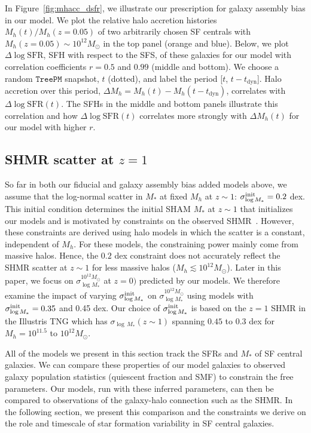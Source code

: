 \documentclass[12pt, letterpaper, preprint, tighten]{aastex62}
\newcommand{\edt}[1]{{\color{dred}{\bf} #1}}
\newcommand{\logsfr}{\log\mathrm{SFR}}
\newcommand{\siglogm}{\sigma_{\log M_*}}
\begin{document}
In Figure~\ref{fig:mhacc_dsfr}, we illustrate our prescription for galaxy
assembly bias in our model. We plot the relative halo accretion histories
$M_h(t)/M_h(z{=}0.05)$ of two arbitrarily chosen SF centrals with
$M_h(z{=}0.05)\sim10^{12}M_\odot$ in the top panel (orange and blue). Below, we plot
$\Delta\logsfr$, SFH with respect to the SFS, of these galaxies for our model with
correlation coefficients $r=0.5$ and $0.99$ (middle and bottom). We choose a
random $\mathtt{TreePM}$ snapshot, $t$ (dotted), and label the period
[$t$, $t - t_\mathrm{dyn}$]. Halo accretion over this period,
$\Delta M_h = M_h(t) - M_h(t-t_\mathrm{dyn})$, correlates with $\Delta\logsfr(t)$.
The SFHs in the middle and bottom panels illustrate this correlation and how
$\Delta\logsfr(t)$ correlates more strongly with $\Delta M_h(t)$ for our model
with higher $r$.

\subsection{\edt{SHMR scatter at $z=1$}} \label{sec:siglogm_init}
\edt{So far in both our fiducial and galaxy assembly bias added models above, 
we assume that the log-normal scatter in $M_*$ at fixed $M_h$ at $z\sim1$:
$\siglogm^{\rm init} = 0.2$ dex. This initial condition determines
the initial SHAM $M_*$ at $z\sim1$ that initializes our models and is motivated
by constraints on the observed SHMR~\citep[\emph{e.g.}][]{leauthaud2012, tinker2013, patel2015}. 
However, these constraints are derived using halo models in which the scatter 
is a constant, independent of $M_h$. For these models, the constraining power 
mainly come from massive halos. Hence, the $0.2$ dex constraint does not 
accurately reflect the SHMR scatter at $z\sim1$ for less massive halos 
($M_h \lesssim 10^{12}M_\odot$). Later in this paper, we focus on 
$\siglogm^{10^{12}M_\odot}$ at $z=0)$ predicted by our models. We 
therefore examine the impact of varying $\siglogm^{\rm init}$ on 
$\siglogm^{10^{12}M_\odot}$ using models with $\siglogm^{\rm init} = 0.35$ and 0.45 dex. 
Our choice of $\siglogm^{\rm init}$ is
based on the $z=1$ SHMR in the Illustris TNG which has $\sigma_{\log\,M_*}(z\sim1)$
spanning $0.45$ to $0.3$ dex for $M_h = 10^{11.5}$ to $10^{12}M_\odot$.}

\edt{All of the models we present in this section track the SFRs and $M_*$ of SF
central galaxies. We can compare these properties of our model galaxies
to observed galaxy population statistics (quiescent fraction and SMF) to
constrain the free parameters.}
Our models, run with these inferred parameters, can then be compared to 
observations of the galaxy-halo connection such as the SHMR. In the following 
section, we present this comparison and the constraints we derive on the role 
and timescale of star formation variability in SF central galaxies.
\end{document}
